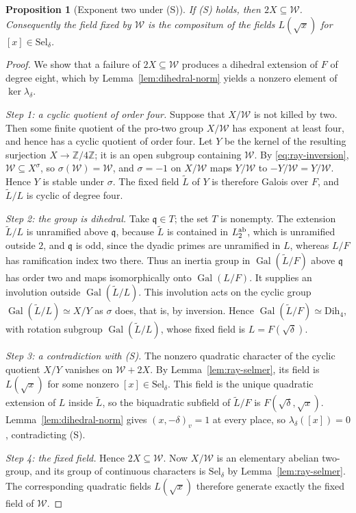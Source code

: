 \documentclass[11pt]{article}
\theoremstyle{plain}
\newtheorem{proposition}[theorem]{Proposition}
\theoremstyle{definition}
\theoremstyle{remark}
\DeclareMathOperator{\Gal}{Gal}
\newcommand{\Z}{\mathbb Z}
\begin{document}
\begin{proposition}[Exponent two under (S)]\label{prop:ray-exponent-two}
If \textup{(S)} holds, then $2X\subseteq\mathcal W$.  Consequently the
field fixed by $\mathcal W$ is the compositum of the fields $L(\sqrt x)$
for $[x]\in\mathrm{Sel}_\delta$.
\end{proposition}

\begin{proof}
We show that a failure of $2X\subseteq\mathcal W$ produces a dihedral
extension of $F$ of degree eight, which by Lemma~\ref{lem:dihedral-norm}
yields a nonzero element of $\ker\lambda_\delta$.

\emph{Step 1: a cyclic quotient of order four.}  Suppose that
$X/\mathcal W$ is not killed by two.  Then some finite quotient of the
pro-two group $X/\mathcal W$ has exponent at least four, and hence has a
cyclic quotient of order four.  Let $Y$ be the kernel of the resulting
surjection $X\to\Z/4\Z$; it is an open subgroup containing $\mathcal W$.
By \eqref{eq:ray-inversion}, $\mathcal W\subseteq X^\sigma$, so
$\sigma(\mathcal W)=\mathcal W$, and $\sigma=-1$ on $X/\mathcal W$ maps
$Y/\mathcal W$ to $-Y/\mathcal W=Y/\mathcal W$.  Hence $Y$ is stable under
$\sigma$.  The fixed field $\widetilde L$ of $Y$ is therefore Galois over
$F$, and $\widetilde L/L$ is cyclic of degree four.

\emph{Step 2: the group is dihedral.}  Take $\mathfrak q\in T$; the set $T$
is nonempty.  The extension $\widetilde L/L$ is unramified above
$\mathfrak q$, because $\widetilde L$ is contained in $L^{\rm ab}_2$,
which is unramified outside $2$, and $\mathfrak q$ is odd, since the
dyadic primes are unramified in $L$, whereas $L/F$ has
ramification index two there.  Thus an inertia group in
$\Gal(\widetilde L/F)$ above $\mathfrak q$ has order two and maps
isomorphically onto $\Gal(L/F)$.  It supplies an involution outside
$\Gal(\widetilde L/L)$.  This involution acts on the cyclic group
$\Gal(\widetilde L/L)\simeq X/Y$ as $\sigma$ does, that is, by inversion.
Hence $\Gal(\widetilde L/F)\simeq\mathrm{Dih}_4$, with rotation subgroup
$\Gal(\widetilde L/L)$, whose fixed field is $L=F(\sqrt\delta)$.

\emph{Step 3: a contradiction with \textup{(S)}.}  The nonzero quadratic
character of the cyclic quotient $X/Y$ vanishes on $\mathcal W+2X$.  By
Lemma~\ref{lem:ray-selmer}, its field is $L(\sqrt x)$ for some nonzero
$[x]\in\mathrm{Sel}_\delta$.  This field is the unique quadratic
extension of $L$ inside $\widetilde L$, so the biquadratic subfield of
$\widetilde L/F$ is $F(\sqrt\delta,\sqrt x)$.
Lemma~\ref{lem:dihedral-norm} gives $(x,-\delta)_v=1$ at every place, so
$\lambda_\delta([x])=0$, contradicting (S).

\emph{Step 4: the fixed field.}  Hence $2X\subseteq\mathcal W$.  Now
$X/\mathcal W$ is an elementary abelian two-group, and its group of
continuous characters is $\mathrm{Sel}_\delta$ by
Lemma~\ref{lem:ray-selmer}.  The corresponding quadratic fields
$L(\sqrt x)$ therefore generate exactly the fixed field of $\mathcal W$.
\end{proof}
\end{document}
